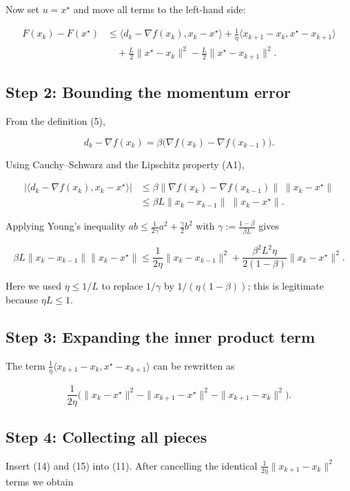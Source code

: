 \documentclass{article}
\begin{document}
Now set $u=x^\star$ and move all terms to the left-hand side:

\[
\begin{aligned}
F(x_k)-F(x^\star) 
&\le \langle d_k-\nabla f(x_k),x_k-x^\star\rangle
      +\frac{1}{\eta}\langle x_{k+1}-x_k, x^\star-x_{k+1}\rangle \\
&\quad +\frac{L}{2}\|x^\star-x_k\|^2-\frac{L}{2}\|x^\star-x_{k+1}\|^2 . \tag{11}
\end{aligned}
\]

\subsection*{Step 2: Bounding the momentum error}
From the definition (5),

\[
d_k-\nabla f(x_k)=\beta\bigl(\nabla f(x_k)-\nabla f(x_{k-1})\bigr). \tag{12}
\]

Using Cauchy–Schwarz and the Lipschitz property (A1),

\[
\begin{aligned}
\bigl|\langle d_k-\nabla f(x_k),x_k-x^\star\rangle\bigr|
&\le \beta\|\nabla f(x_k)-\nabla f(x_{k-1})\|\;\|x_k-x^\star\|\\
&\le \beta L\|x_k-x_{k-1}\|\;\|x_k-x^\star\|. \tag{13}
\end{aligned}
\]

Applying Young’s inequality $ab\le\frac{1}{2\gamma}a^2+\frac{\gamma}{2}b^2$ with $\gamma:=\frac{1-\beta}{\beta L}$ gives  

\[
\beta L\|x_k-x_{k-1}\|\|x_k-x^\star\|
\le\frac{1}{2\eta}\|x_k-x_{k-1}\|^2
   +\frac{\beta^2 L^2\eta}{2(1-\beta)}\|x_k-x^\star\|^2 . \tag{14}
\]

Here we used $\eta\le 1/L$ to replace $1/\gamma$ by $1/( \eta(1-\beta))$; this is legitimate because $\eta L\le1$.  

\subsection*{Step 3: Expanding the inner product term}
The term $\frac{1}{\eta}\langle x_{k+1}-x_k, x^\star-x_{k+1}\rangle$ can be rewritten as  

\[
\frac{1}{2\eta}\bigl(\|x_k-x^\star\|^2-\|x_{k+1}-x^\star\|^2-\|x_{k+1}-x_k\|^2\bigr). \tag{15}
\]

\subsection*{Step 4: Collecting all pieces}
Insert (14) and (15) into (11). After cancelling the identical $\frac{1}{2\eta}\|x_{k+1}-x_k\|^2$ terms we obtain
\end{document}

